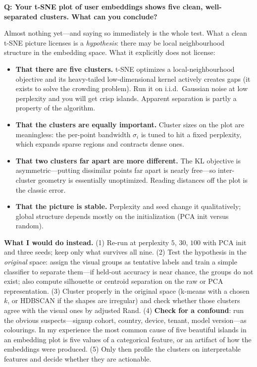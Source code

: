 \begin{interviewq}
\textbf{Q: Your t-SNE plot of user embeddings shows five clean, well-separated clusters. What can you conclude?}

 \quad {} \quad \badgefreq{\freqhigh}

\stronganswer

Almost nothing yet---and saying so immediately is the whole test. What a clean t-SNE picture licenses is a \emph{hypothesis}: there may be local neighbourhood structure in the embedding space. What it explicitly does not license:

\begin{itemize}
    \item \textbf{That there are five clusters.} t-SNE optimizes a local-neighbourhood objective and its heavy-tailed low-dimensional kernel actively creates gaps (it exists to solve the crowding problem). Run it on i.i.d.\ Gaussian noise at low perplexity and you will get crisp islands. Apparent separation is partly a property of the algorithm.
    \item \textbf{That the clusters are equally important.} Cluster sizes on the plot are meaningless: the per-point bandwidth $\sigma_i$ is tuned to hit a fixed perplexity, which expands sparse regions and contracts dense ones.
    \item \textbf{That two clusters far apart are more different.} The KL objective is asymmetric---putting dissimilar points far apart is nearly free---so inter-cluster geometry is essentially unoptimized. Reading distances off the plot is the classic error.
    \item \textbf{That the picture is stable.} Perplexity and seed change it qualitatively; global structure depends mostly on the initialization (PCA init versus random).
\end{itemize}

\textbf{What I would do instead.} (1) Re-run at perplexity $5$, $30$, $100$ with PCA init and three seeds; keep only what survives all nine. (2) Test the hypothesis in the \emph{original} space: assign the visual groups as tentative labels and train a simple classifier to separate them---if held-out accuracy is near chance, the groups do not exist; also compute silhouette or centroid separation on the raw or PCA representation. (3) Cluster properly in the original space (k-means with a chosen $k$, or HDBSCAN if the shapes are irregular) and check whether those clusters agree with the visual ones by adjusted Rand. (4) \textbf{Check for a confound}: run the obvious suspects---signup cohort, country, device, tenant, model version---as colourings. In my experience the most common cause of five beautiful islands in an embedding plot is five values of a categorical feature, or an artifact of how the embeddings were produced. (5) Only then profile the clusters on interpretable features and decide whether they are actionable.


\end{interviewq}
